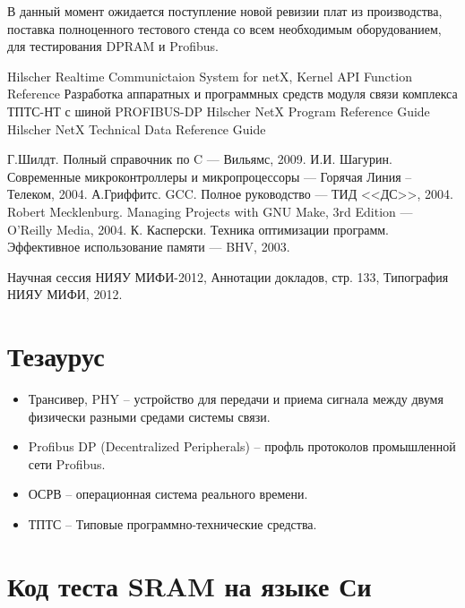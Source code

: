 \documentclass[a4paper,14pt,bachelor]{disser}
\begin{document}
В данный момент ожидается поступление новой ревизии плат из производства, поставка полноценного тестового стенда со всем необходимым оборудованием, для тестирования DPRAM и Profibus.


\begin{thebibliography}{00} %
 Hilscher Realtime Communictaion System for netX, Kernel API Function Reference
 Разработка аппаратных и программных средств модуля связи комплекса ТПТС-НТ с шиной PROFIBUS-DP
 Hilscher NetX Program Reference Guide
 Hilscher NetX Technical Data Reference Guide

 Г.Шилдт. Полный справочник по C --- Вильямс, 2009.
 И.И. Шагурин. Современные микроконтроллеры и микропроцессоры --- Горячая Линия -- Телеком, 2004.
 А.Гриффитс. GCC. Полное руководство --- ТИД <<ДС>>, 2004.
 Robert Mecklenburg. Managing Projects with GNU Make, 3rd Edition --- O'Reilly Media, 2004.
 К. Касперски. Техника оптимизации программ. Эффективное использование памяти --- BHV, 2003.

 Научная сессия НИЯУ МИФИ-2012, Аннотации докладов, стр. 133, Типография НИЯУ МИФИ, 2012.

\end{thebibliography}

\chapter*{Тезаурус}
\begin{itemize} %
 \item Трансивер, PHY -- устройство для передачи и приема сигнала между двумя физически разными средами системы связи.
 \item Profibus DP (Decentralized Peripherals) -- профль протоколов промышленной сети Profibus.
 \item ОСРВ -- операционная система реального времени.
 \item ТПТС -- Типовые программно-технические средства.
\end{itemize}

\appendix
\chapter{\label{sram-c}Код теста SRAM на языке Си}

\end{document}
